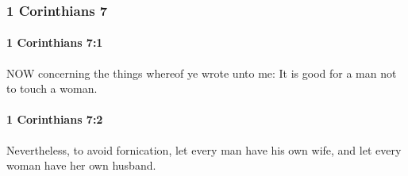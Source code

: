 	\subsubsection{1 Corinthians 7} %
		\label{1CORINTHIANS-7}
		
		\paragraph{1 Corinthians 7:1} %
			\label{1CORINTHIANS-7-1}

			NOW concerning the things whereof ye wrote unto me: It is good for a man not to touch a woman.

			\begin{framed}
			\scriptsize
				\begin{compactdesc}
					\item[SBLG] 
				\end{compactdesc}
			\end{framed}

		\paragraph{1 Corinthians 7:2} %
			\label{1CORINTHIANS-7-2}

			Nevertheless, to avoid fornication, let every man have his own wife, and let every woman have her own husband.

